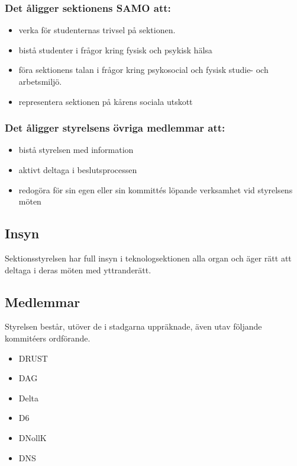 \subsubsection{Det åligger sektionens SAMO att:}

\begin{itemize}
    \item verka för studenternas trivsel på sektionen.
    \item bistå studenter i frågor kring fysisk och psykisk hälsa
    \item föra sektionens talan i frågor kring psykosocial och fysisk studie- och arbetsmiljö.
    \item representera sektionen på kårens sociala utskott
\end{itemize}

\subsubsection{Det åligger styrelsens övriga medlemmar att:}

\begin{itemize}
  \item bistå styrelsen med information 
  \item aktivt deltaga i beslutsprocessen 
  \item redogöra för sin egen eller sin kommittés löpande verksamhet vid styrelsens möten 
\end{itemize}

\subsection{Insyn} 

Sektionsstyrelsen har full insyn i teknologsektionen alla organ och äger rätt att deltaga i deras möten med yttranderätt. 

\subsection{Medlemmar} 
Styrelsen består, utöver de i stadgarna uppräknade, även utav följande kommitéers ordförande. 
\begin{itemize}
  \item DRUST 
  \item DAG 
  \item Delta 
  \item D6 
  \item DNollK
  \item DNS
\end{itemize}

